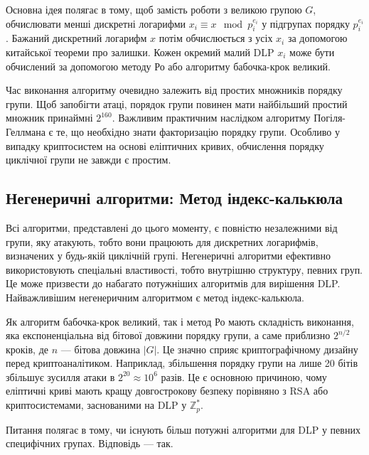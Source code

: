 \documentclass[12pt]{report}
\theoremstyle{definition}
\theoremstyle{plain}
\begin{document}
Основна ідея полягає в тому, щоб замість роботи з великою групою \( G \), обчислювати менші дискретні логарифми \( x_i \equiv x \mod p_i^{e_i} \) у підгрупах порядку \( p_i^{e_i} \). Бажаний дискретний логарифм \( x \) потім обчислюється з усіх \( x_i \) за допомогою китайської теореми про залишки. Кожен окремий малий DLP \( x_i \) може бути обчислений за допомогою методу Ро або алгоритму бабочка-крок великий.

Час виконання алгоритму очевидно залежить від простих множників порядку групи. Щоб запобігти атаці, порядок групи повинен мати найбільший простий множник принаймні \( 2^{160} \). Важливим практичним наслідком алгоритму Погіля-Геллмана є те, що необхідно знати факторизацію порядку групи. Особливо у випадку криптосистем на основі еліптичних кривих, обчислення порядку циклічної групи не завжди є простим.

\subsection{Негенеричні алгоритми: Метод індекс-калькюла}

Всі алгоритми, представлені до цього моменту, є повністю незалежними від групи, яку атакують, тобто вони працюють для дискретних логарифмів, визначених у будь-якій циклічній групі. Негенеричні алгоритми ефективно використовують спеціальні властивості, тобто внутрішню структуру, певних груп. Це може призвести до набагато потужніших алгоритмів для вирішення DLP. Найважливішим негенеричним алгоритмом є метод індекс-калькюла.

Як алгоритм бабочка-крок великий, так і метод Ро мають складність виконання, яка експоненціальна від бітової довжини порядку групи, а саме приблизно \( 2^{n/2} \) кроків, де \( n \) — бітова довжина \( |G| \). Це значно сприяє криптографічному дизайну перед криптоаналітиком. Наприклад, збільшення порядку групи на лише 20 бітів збільшує зусилля атаки в \( 2^{20} \approx 10^6 \) разів. Це є основною причиною, чому еліптичні криві мають кращу довгострокову безпеку порівняно з RSA або криптосистемами, заснованими на DLP у \( \mathbb{Z}^*_p \).

Питання полягає в тому, чи існують більш потужні алгоритми для DLP у певних специфічних групах. Відповідь — так.
\end{document}
